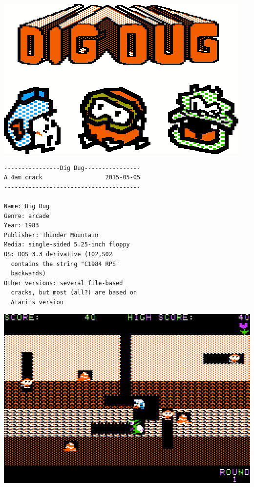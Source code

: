 \documentclass{article}
\begin{document}
\newpage
{}

\vspace*{-\baselineskip}

\tableofcontents

\vspace*{\fill}

\centerline{\includegraphics[width=.9\textwidth]{title}}

\vspace*{\fill}

\newpage


\begin{verbatim}
----------------Dig Dug----------------
A 4am crack                  2015-05-05
---------------------------------------

Name: Dig Dug
Genre: arcade
Year: 1983
Publisher: Thunder Mountain
Media: single-sided 5.25-inch floppy
OS: DOS 3.3 derivative (T02,S02
  contains the string "C1984 RPS"
  backwards)
Other versions: several file-based
  cracks, but most (all?) are based on
  Atari's version
\end{verbatim}

\vspace*{3\baselineskip}

\centerline{\includegraphics[width=.9\textwidth]{level1}}
\end{document}
